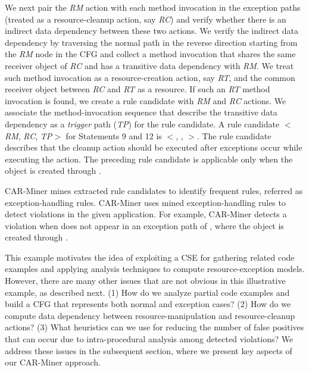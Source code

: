 {We next pair the \emph{RM} action with each method invocation in the exception paths
(treated as a resource-cleanup action, say \emph{RC}) and verify
whether there is an indirect data dependency between these two actions.
We verify the indirect data dependency by traversing the normal path 
in the reverse direction starting from the \emph{RM} node in the CFG and collect
a method invocation that shares the same receiver object of \emph{RC} and has 
a transitive data dependency with \emph{RM}.
We treat such method invocation as a resource-creation action, say \emph{RT},
and the common receiver object between \emph{RC} and \emph{RT} as a resource.
If such an \emph{RT} method invocation is found,
we create a rule candidate with \emph{RM} and \emph{RC}
actions. We associate the method-invocation sequence that describe the transitive data dependency as
a \emph{trigger} path (\emph{TP}) for the rule candidate. A rule candidate $<$\emph{RM}, \emph{RC}, \emph{TP}$>$
for Statements 9 and 12 is $<$, ,
$>$. The rule candidate describes that the cleanup action 
 should be executed after exceptions occur while
executing the  action. The preceding rule candidate is applicable
only when the  object is created through .

CAR-Miner mines extracted rule candidates to identify frequent rules, referred
as exception-handling rules. CAR-Miner uses mined exception-handling rules 
to detect violations in the given application. For example, CAR-Miner detects a violation
when  does not appear in an exception path of ,
where the  object is created through .

This example motivates the idea of exploiting a CSE for gathering related code examples 
and applying analysis techniques to compute resource-exception models. 
However, there are many other issues that are
not obvious in this illustrative example, as described next.
(1) How do we analyze partial code examples and build
a CFG that represents both normal and exception cases? (2) How do we 
compute data dependency between resource-manipulation and resource-cleanup actions? 
(3) What heuristics can we use for reducing
the number of false positives that can occur due to intra-procedural
analysis among detected violations? We address these issues in
the subsequent section, where we present key aspects of our CAR-Miner approach.}